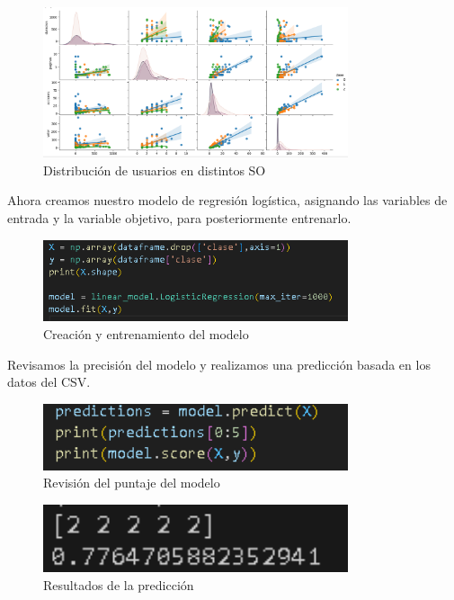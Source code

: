 \documentclass{article}
\begin{document}
\begin{figure}[H]
    \centering
    \includegraphics[width=0.8\textwidth]{img/7.png}
    \caption{Distribución de usuarios en distintos SO}
\end{figure}

Ahora creamos nuestro modelo de regresión logística, asignando las variables de entrada y la variable objetivo, para posteriormente entrenarlo.

\begin{figure}[H]
    \centering
    \includegraphics[width=0.8\textwidth]{img/8.png}
    \caption{Creación y entrenamiento del modelo}
\end{figure}

Revisamos la precisión del modelo y realizamos una predicción basada en los datos del CSV.

\begin{figure}[H]
    \centering
    \includegraphics[width=0.8\textwidth]{img/9.png}
    \caption{Revisión del puntaje del modelo}
\end{figure}

\begin{figure}[H]
    \centering
    \includegraphics[width=0.8\textwidth]{img/10.png}
    \caption{Resultados de la predicción}
\end{figure}
\end{document}
